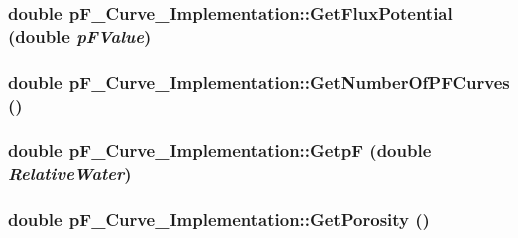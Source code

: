 \label{classp_f___curve___implementation_abefa0a2ca31acc282ec9f0ec0d478fa0}
\hypertarget{classp_f___curve___implementation_a4bbf84d9bb853260ab867467e6f9b739}{
\subsubsection[{GetFluxPotential}]{\setlength{\rightskip}{0pt plus 5cm}double pF\_\-Curve\_\-Implementation::GetFluxPotential (double {\em pFValue})}}
\label{classp_f___curve___implementation_a4bbf84d9bb853260ab867467e6f9b739}
\hypertarget{classp_f___curve___implementation_a5728a4c645edd079e83517c862f367b3}{
\subsubsection[{GetNumberOfPFCurves}]{\setlength{\rightskip}{0pt plus 5cm}double pF\_\-Curve\_\-Implementation::GetNumberOfPFCurves ()}}
\label{classp_f___curve___implementation_a5728a4c645edd079e83517c862f367b3}
\hypertarget{classp_f___curve___implementation_aa242b6233b8d7c729fb09134d13577c3}{
\subsubsection[{GetpF}]{\setlength{\rightskip}{0pt plus 5cm}double pF\_\-Curve\_\-Implementation::GetpF (double {\em RelativeWater})}}
\label{classp_f___curve___implementation_aa242b6233b8d7c729fb09134d13577c3}
\hypertarget{classp_f___curve___implementation_a25faa888ce16f43ff602c46721f8487d}{
\subsubsection[{GetPorosity}]{\setlength{\rightskip}{0pt plus 5cm}double pF\_\-Curve\_\-Implementation::GetPorosity ()}}
